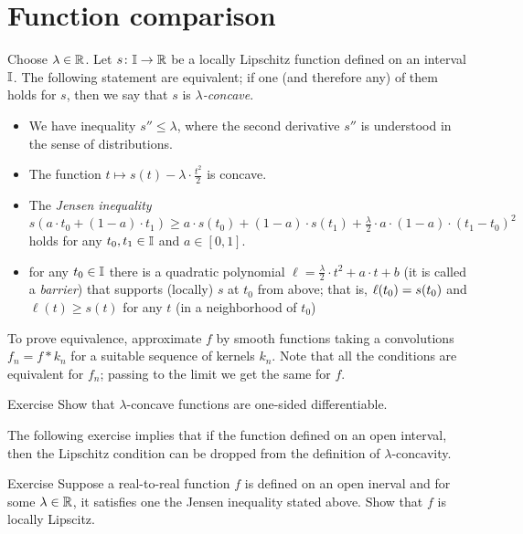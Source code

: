 \section{Function comparison}\label{Function comparison}

Choose $\lambda\in \mathbb{R}$.
Let $s\colon\mathbb{I}\to\mathbb{R}$ be a locally Lipschitz function defined on an interval $\mathbb{I}$.
The following statement are equivalent;
if one (and therefore any) of them holds for $s$, then we say that $s$ is \emph{$\lambda$-concave}.
\begin{itemize}
\item We have inequality $s''\le \lambda$, where the second derivative $s''$ is understood in the sense of distributions.
\item The function $t\mapsto s(t)-\lambda\cdot\tfrac{t^2}2$ is concave.
\item The \emph{Jensen inequality}
\[s(a\cdot t_0+(1-a)\cdot t_1)\ge a\cdot s(t_0)+(1-a)\cdot s(t_1)+\tfrac\lambda2\cdot a\cdot(1-a)\cdot(t_1-t_0)^2 \]
holds for any $t_0,t_1\in \mathbb{I}$ and $a\in[0,1]$.
\item for any $t_0\in \mathbb{I}$ there is a quadratic polynomial $\ell=\tfrac\lambda2\cdot t^2+a\cdot t+b$ (it is called a \emph{barrier}) that supports (locally) $s$ at $t_0$ from above;
that is, $\ell(t_0)= s(t_0)$ and $\ell(t)\ge s(t)$ for any $t$ (in a neighborhood of $t_0$)
\end{itemize}

To prove equivalence, approximate $f$ by smooth functions taking a convolutions $f_n=f*k_n$ for a suitable sequence of kernels $k_n$.
Note that all the conditions are equivalent for $f_n$;
passing to the limit we get the same for $f$.

\begin{thm}{Exercise}\label{ex:concave'}
Show that $\lambda$-concave functions are one-sided differentiable.
\end{thm}

The following exercise implies that if the function defined on an open interval, then the Lipschitz condition can be dropped from the definition of $\lambda$-concavity.

\begin{thm}{Exercise}\label{ex:concave-open}
Suppose a real-to-real function $f$ is defined on an open inerval and for some $\lambda\in\mathbb{R}$, it satisfies one the Jensen inequality stated above.
Show that $f$ is locally Lipscitz.
\end{thm}

